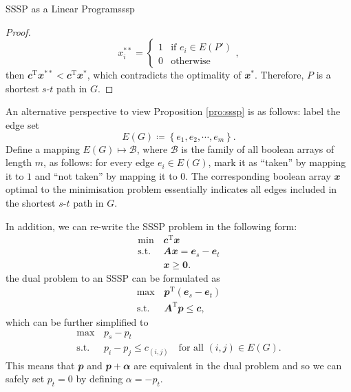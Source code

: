 \documentclass[math, code]{amznotes}
\theoremstyle{remark}
\begin{document}
\begin{probox}{SSSP as a Linear Program}{sssp}
\begin{proof}
        \begin{equation*}
            x^{**}_i = \begin{cases}
                1 & \textrm{if } e_i \in E(P') \\
                0 & \textrm{otherwise}
            \end{cases},
        \end{equation*}
        then $\mathbfit{c}^{\mathrm{T}}\mathbfit{x}^{**} < \mathbfit{c}^{\mathrm{T}}\mathbfit{x}^{*}$, which contradicts the optimality of $\mathbfit{x}^*$. Therefore, $P$ is a shortest $s$-$t$ path in $G$. 
    \end{proof}
\end{probox}
An alternative perspective to view Proposition \ref{pro:sssp} is as follows: label the edge set 
\begin{equation*}
    E(G) \coloneqq \left\{e_1, e_2, \cdots, e_m\right\}.
\end{equation*}
Define a mapping $E(G) \mapsto \mathcal{B}$, where $\mathcal{B}$ is the family of all boolean arrays of length $m$, as follows: for every edge $e_i \in E(G)$, mark it as ``taken'' by mapping it to $1$ and ``not taken'' by mapping it to $0$. The corresponding boolean array $\mathbfit{x}$ optimal to the minimisation problem essentially indicates all edges included in the shortest $s$-$t$ path in $G$.

In addition, we can re-write the SSSP problem in the following form:
\begin{align*}
    \min\,& \mathbfit{c}^{\mathrm{T}}\mathbfit{x} \\
    \textrm{s.t. } & \mathbfit{Ax} = \mathbfit{e}_s - \mathbfit{e}_t \\
    & \mathbfit{x} \geq \mathbf{0}.
\end{align*}
the dual problem to an SSSP can be formulated as 
\begin{align*}
    \max\,& \mathbfit{p}^{\mathrm{T}}\left(\mathbfit{e}_s - \mathbfit{e}_t\right) \\
    \textrm{s.t. } & \mathbfit{A}^{\mathrm{T}}\mathbfit{p} \leq \mathbfit{c},
\end{align*}
which can be further simplified to 
\begin{align*}
    \max\,& p_s - p_t \\
    \textrm{s.t. } & p_i - p_j \leq c_{(i, j)} \quad \textrm{for all } (i, j) \in E(G).
\end{align*}
This means that $\mathbfit{p}$ and $\mathbfit{p} + \mathbfit{\alpha}$ are equivalent in the dual problem and so we can safely set $p_t = 0$ by defining $\alpha = -p_t$.
\end{document}

